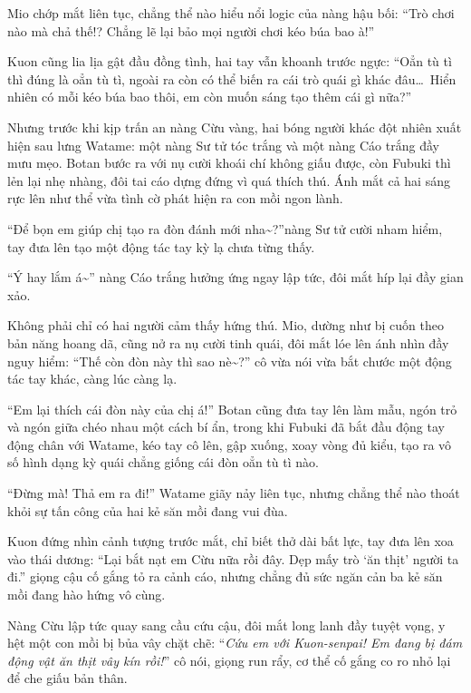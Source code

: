 \documentclass[../main.tex]{subfiles}
\begin{document}
Mio chớp mắt liên tục, chẳng thể nào hiểu nổi logic của nàng hậu bối: ``Trò chơi nào mà chả thế!? Chẳng lẽ lại bảo mọi người chơi kéo búa bao à!''

Kuon cũng lia lịa gật đầu đồng tình, hai tay vẫn khoanh trước ngực: ``Oẳn tù tì thì đúng là oẳn tù tì, ngoài ra còn có thể biến ra cái trò quái gì khác đâu\dots\ Hiển nhiên có mỗi kéo búa bao thôi, em còn muốn sáng tạo thêm cái gì nữa?''

Nhưng trước khi kịp trấn an nàng Cừu vàng, hai bóng người khác đột nhiên xuất hiện sau lưng Watame: một nàng Sư tử tóc trắng và một nàng Cáo trắng đầy mưu mẹo. Botan bước ra với nụ cười khoái chí không giấu được, còn Fubuki thì lẻn lại nhẹ nhàng, đôi tai cáo dựng đứng vì quá thích thú. Ánh mắt cả hai sáng rực lên như thể vừa tình cờ phát hiện ra con mồi ngon lành.

``Để bọn em giúp chị tạo ra đòn đánh mới nha\~{}?''nàng Sư tử cười nham hiểm, tay đưa lên tạo một động tác tay kỳ lạ chưa từng thấy.

``Ý hay lắm á\~{}'' nàng Cáo trắng hưởng ứng ngay lập tức, đôi mắt híp lại đầy gian xảo.

Không phải chỉ có hai người cảm thấy hứng thú. Mio, dường như bị cuốn theo bản năng hoang dã, cũng nở ra nụ cười tinh quái, đôi mắt lóe lên ánh nhìn đầy nguy hiểm: ``Thế còn đòn này thì sao nè\~{}?'' cô vừa nói vừa bắt chước một động tác tay khác, càng lúc càng lạ.


``Em lại thích cái đòn này của chị á!'' Botan cũng đưa tay lên làm mẫu, ngón trỏ và ngón giữa chéo nhau một cách bí ẩn, trong khi Fubuki đã bắt đầu động tay động chân với Watame, kéo tay cô lên, gập xuống, xoay vòng đủ kiểu, tạo ra vô số hình dạng kỳ quái chẳng giống cái đòn oẳn tù tì nào.

``Đừng mà! Thả em ra đi!'' Watame giãy nảy liên tục, nhưng chẳng thể nào thoát khỏi sự tấn công của hai kẻ săn mồi đang vui đùa.

Kuon đứng nhìn cảnh tượng trước mắt, chỉ biết thở dài bất lực, tay đưa lên xoa vào thái dương: ``Lại bắt nạt em Cừu nữa rồi đây. Dẹp mấy trò `ăn thịt' người ta đi.'' giọng cậu cố gắng tỏ ra cảnh cáo, nhưng chẳng đủ sức ngăn cản ba kẻ săn mồi đang hào hứng vô cùng.

Nàng Cừu lập tức quay sang cầu cứu cậu, đôi mắt long lanh đầy tuyệt vọng, y hệt một con mồi bị bủa vây chặt chẽ: ``\textit{Cứu em với Kuon-senpai! Em đang bị đám động vật ăn thịt vây kín rồi!}'' cô nói, giọng run rẩy, cơ thể cố gắng co ro nhỏ lại để che giấu bản thân.
\end{document}
